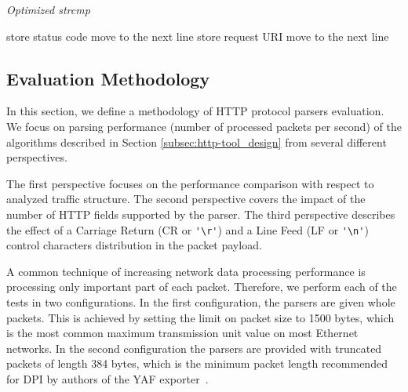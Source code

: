 \begin{algorithm}[tb]
\caption{\emph{Optimized strcmp}}
\label{alg:optimized-strcmp}
{\fontsize{8}{10}\selectfont
\begin{algorithmic}[1]
        \STATE store status code
                \ENDIF
            \ENDFOR
            \STATE move to the next line
        \ENDWHILE
    \ENDIF
        \STATE store request URI
                \ENDIF
            \ENDFOR
            \STATE move to the next line
        \ENDWHILE
    \ENDIF
\end{algorithmic}
}
\end{algorithm}

\subsection{Evaluation Methodology} \label{subsec:http-metodology}

In this section, we define a methodology of HTTP protocol parsers evaluation. We focus on parsing performance (number of processed packets per second) of the algorithms described in Section \ref{subsec:http-tool_design} from several different perspectives.

The first perspective focuses on the performance comparison with respect to analyzed traffic structure. The second perspective covers the impact of the number of HTTP fields supported by the parser. The third perspective describes the effect of a Carriage Return (CR or \verb!'\r'!) and a Line Feed  (LF or \verb!'\n'!) control characters distribution in the packet payload.

A common technique of increasing network data processing performance is processing only important part of each packet. Therefore, we perform each of the tests in two configurations. In the first configuration, the parsers are given whole packets. This is achieved by setting the limit on packet size to 1500 bytes, which is the most common maximum transmission unit value on most Ethernet networks. In the second configuration the parsers are provided with truncated packets of length 384 bytes, which is the minimum packet length recommended for DPI by authors of the YAF exporter~\cite{Inacio-2010-YAF}.

